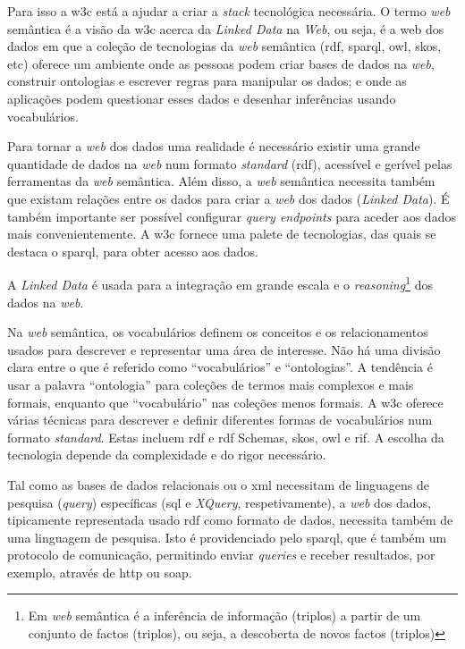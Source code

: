 Para isso a \acrfull{w3c} está a ajudar a criar a \textit{stack} tecnológica necessária. O termo \textit{web} semântica é a visão da \acrshort{w3c} acerca da \textit{Linked Data} na \textit{Web}, ou seja, é a web dos dados em que a coleção de tecnologias da \textit{web} semântica (\acrshort{rdf}, \acrshort{sparql}, \acrshort{owl}, \acrshort{skos}, etc) oferece um ambiente onde as pessoas podem criar bases de dados na \textit{web}, construir ontologias e escrever regras para manipular os dados; e onde as aplicações podem questionar esses dados e desenhar inferências usando vocabulários.

Para tornar a \textit{web} dos dados uma realidade é necessário existir uma grande quantidade de dados na \textit{web} num formato \textit{standard} (\acrshort{rdf}), acessível e gerível pelas ferramentas da \textit{web} semântica. Além disso, a \textit{web} semântica necessita também que existam relações entre os dados para criar a \textit{web} dos dados (\textit{Linked Data}). É também importante ser possível configurar \textit{query endpoints} para aceder aos dados mais convenientemente. A \acrshort{w3c} fornece uma palete de tecnologias, das quais se destaca o \acrshort{sparql}, para obter acesso aos dados.

A \textit{Linked Data} é usada para a integração em grande escala e o \textit{reasoning}\footnote{Em \textit{web} semântica é a inferência de informação (triplos) a partir de um conjunto de factos (triplos), ou seja, a descoberta de novos factos (triplos)} dos dados na \textit{web}.

Na \textit{web} semântica, os vocabulários definem os conceitos e os relacionamentos usados para descrever e representar uma área de interesse. Não há uma divisão clara entre o que é referido como ``vocabulários'' e ``ontologias''. A tendência é usar a palavra ``ontologia'' para coleções de termos mais complexos e mais formais, enquanto que ``vocabulário'' nas coleções menos formais. A \acrshort{w3c} oferece várias técnicas para descrever e definir diferentes formas de vocabulários num formato \textit{standard}. Estas incluem \acrshort{rdf} e \acrshort{rdf} Schemas, \acrshort{skos}, \acrshort{owl} e \acrshort{rif}. A escolha da tecnologia depende da complexidade e do rigor necessário.

Tal como as bases de dados relacionais ou o \acrshort{xml} necessitam de linguagens de pesquisa (\textit{query}) específicas (\acrshort{sql} e \textit{XQuery}, respetivamente), a \textit{web} dos dados, tipicamente representada usado \acrshort{rdf} como formato de dados, necessita também de uma linguagem de pesquisa. Isto é providenciado pelo \acrshort{sparql}, que é também um protocolo de comunicação, permitindo enviar \textit{queries} e receber resultados, por exemplo, através de \acrshort{http} ou \acrshort{soap}.

